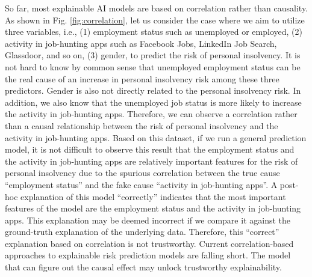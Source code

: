 \documentclass[letterpaper]{article} %
\theoremstyle{definition}
\theoremstyle{remark}
\begin{document}
So far, most explainable AI models are based on correlation rather than causality. As shown in Fig. \ref{fig:correlation}, let us consider the case where we aim to utilize three variables, i.e., (1) employment status such as unemployed or employed, (2) activity in job-hunting apps such as Facebook Jobs, LinkedIn Job Search, Glassdoor, and so on, (3) gender, to predict the risk of personal insolvency. It is not hard to know by common sense that unemployed employment status can be the real cause of an increase in personal insolvency risk among these three predictors. Gender is also not directly related to the personal insolvency risk. In addition, we also know that the unemployed job status is more likely to increase the activity in job-hunting apps. Therefore, we can observe a correlation rather than a causal relationship between the risk of personal insolvency and the activity in job-hunting apps. Based on this dataset, if we run a general prediction model, it is not difficult to observe this result that the employment status and the activity in job-hunting apps are relatively important features for the risk of personal insolvency due to the spurious correlation between the true cause ``employment status'' and the fake cause ``activity in job-hunting apps''. A post-hoc explanation of this model ``correctly'' indicates that the most important features of the model are the employment status and the activity in job-hunting apps. This explanation may be deemed incorrect if we compare it against the ground-truth explanation of the underlying data. Therefore, this ``correct'' explanation based on correlation is not trustworthy. Current correlation-based approaches to explainable risk prediction models are falling short.
The model that can figure out the causal effect may unlock trustworthy explainability.
\end{document}
